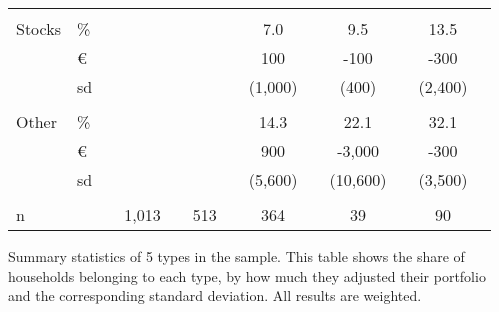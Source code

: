 \begin{table}[ht!]
{\begin{threeparttable}
\begin{tabular}{ll|ccccccccccc}
				&  &  &  &  &  &  &  &  &  &  &  &  \\
				Stocks & \% &  &  &  &  &  & 7.0 &  & 9.5 &  & 13.5 &  \\
				& \euro &  &  &  &  &  & 100 &  & -100 &  & -300 &  \\
				& sd &  &  &  &  &  & (1,000) &  & (400) &  & (2,400) &  \\
				&  &  &  &  &  &  &  &  &  &  &  &  \\
				Other & \% &  &  &  &  &  & 14.3 &  & 22.1 &  & 32.1 &  \\
				& \euro &  &  &  &  &  & 900 &  & -3,000 &  & -300 &  \\
				& sd &  &  &  &  &  & (5,600) &  & (10,600) &  & (3,500) &  \\ \hline
				&  &  &  &  &  &  &  &  &  &  &  &  \\
				n &  &  & 1,013 &  & 513 &  & 364 &  & 39 &  & 90 & \\ \hline \hline
			\end{tabular}
			\begin{tablenotes}\footnotesize
				\item[] Summary statistics of 5 types in the sample. This table shows the share of households belonging to each type, by how much they adjusted their portfolio and the corresponding standard deviation. All results are weighted.
			\end{tablenotes}
		\end{threeparttable}
	}
\end{table}

